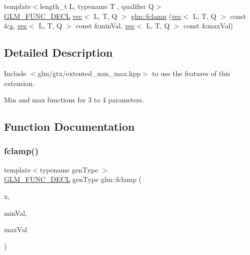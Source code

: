 \begin{DoxyCompactItemize}
\item 
{\footnotesize template$<$length\+\_\+t L, typename T , qualifier Q$>$ }\\\mbox{\hyperlink{setup_8hpp_ab2d052de21a70539923e9bcbf6e83a51}{G\+L\+M\+\_\+\+F\+U\+N\+C\+\_\+\+D\+E\+CL}} \mbox{\hyperlink{structglm_1_1vec}{vec}}$<$ L, T, Q $>$ \mbox{\hyperlink{group__gtx__extended__min__max_ga5c15fa4709763c269c86c0b8b3aa2297}{glm\+::fclamp}} (\mbox{\hyperlink{structglm_1_1vec}{vec}}$<$ L, T, Q $>$ const \&\mbox{\hyperlink{_s_d_l__opengl_8h_ad0e63d0edcdbd3d79554076bf309fd47}{x}}, \mbox{\hyperlink{structglm_1_1vec}{vec}}$<$ L, T, Q $>$ const \&min\+Val, \mbox{\hyperlink{structglm_1_1vec}{vec}}$<$ L, T, Q $>$ const \&max\+Val)
\end{DoxyCompactItemize}


\subsection{Detailed Description}
Include $<$glm/gtx/extented\+\_\+min\+\_\+max.\+hpp$>$ to use the features of this extension.

Min and max functions for 3 to 4 parameters. 

\subsection{Function Documentation}
\mbox{\label{group__gtx__extended__min__max_ga1e28539d3a46965ed9ef92ec7cb3b18a}} 
\subsubsection{\texorpdfstring{fclamp()}{fclamp()}\hspace{0.1cm}{\footnotesize\ttfamily [1/3]}}
{\footnotesize\ttfamily template$<$typename gen\+Type $>$ \\
\mbox{\hyperlink{setup_8hpp_ab2d052de21a70539923e9bcbf6e83a51}{G\+L\+M\+\_\+\+F\+U\+N\+C\+\_\+\+D\+E\+CL}} gen\+Type glm\+::fclamp (\begin{DoxyParamCaption}\item[{gen\+Type}]{x,  }\item[{gen\+Type}]{min\+Val,  }\item[{gen\+Type}]{max\+Val }\end{DoxyParamCaption})}

